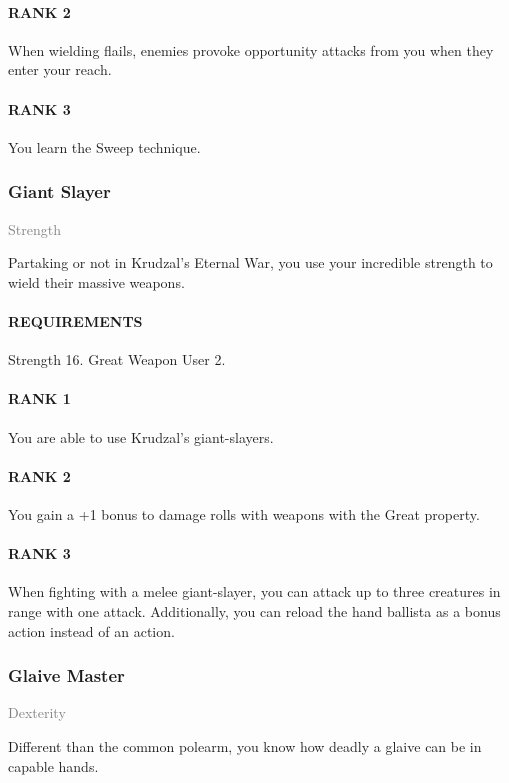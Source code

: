 \paragraph{RANK 2} When wielding flails, enemies provoke opportunity attacks from you when they enter your reach.
\paragraph{RANK 3} You learn the Sweep technique.

\subsubsection{Giant Slayer} \label{feat::giantslayer}
\small{\textcolor{gray}{Strength}}

\normalsize
Partaking or not in Krudzal's Eternal War, you use your incredible strength to wield their massive weapons.
\paragraph{REQUIREMENTS} Strength 16. Great Weapon User 2.
\paragraph{RANK 1} You are able to use Krudzal's giant-slayers.
\paragraph{RANK 2} You gain a +1 bonus to damage rolls with weapons with the Great property.
\paragraph{RANK 3} When fighting with a melee giant-slayer, you can attack up to three creatures in range with one attack.
Additionally, you can reload the hand ballista as a bonus action instead of an action.

\subsubsection{Glaive Master} \label{feat::glaivemaster}
\small{\textcolor{gray}{Dexterity}}

\normalsize
Different than the common polearm, you know how deadly a glaive can be in capable hands.
